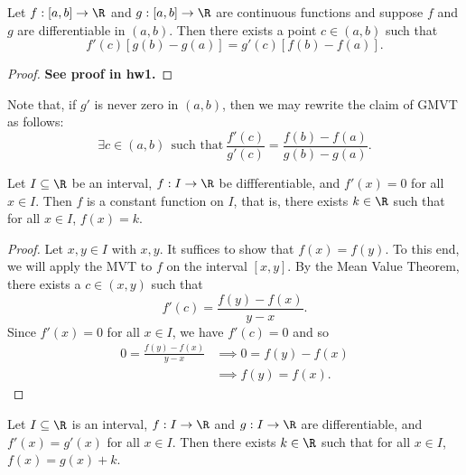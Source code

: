 \begin{theorem}\label{Generalized Mean Value Theorem}
    Let \( f: [a,b] \to \R  \) and \( g : [a,b] \to \R  \) are continuous functions and suppose \( f  \) and \( g  \) are differentiable in \( (a,b) \). Then there exists a point \( c \in (a,b) \) such that 
    \[  f'(c) [g(b) - g(a)] = g'(c) [f(b) - f(a)]. \]
\end{theorem}
\begin{proof}
    \textbf{See proof in hw1.}
\end{proof}

\begin{remark}
    Note that, if \( g'  \) is never zero in \( (a,b) \), then we may rewrite the claim of GMVT as follows:
    \[  \exists c \in (a,b) \ \ \text{such that} \ \frac{ f'(c) }{  g'(c) } =  \frac{ f(b) - f(a) }{  g(b) - g(a) }. \]
\end{remark}

\begin{corollary}[Corollary 1]\label{Corollary 1}
    Let \( I \subseteq  \R   \) be an interval, \( f : I \to \R  \) be diffferentiable, and \( f'(x) = 0  \) for all \( x \in I  \). Then \( f  \) is a constant function on \( I  \), that is, there exists \( k \in \R  \) such that for all \( x \in I  \), \( f(x) = k  \). 
\end{corollary}

\begin{proof}
    Let \( x,y \in I  \) with \( x , y  \). It suffices to show that \( f(x) = f(y) \). To this end, we will apply the MVT to \( f  \) on the interval \( [x,y] \). By the Mean Value Theorem, there exists a \( c \in (x,y) \) such that 
    \[  f'(c) = \frac{ f(y) - f(x)  }{  y - x  }. \]
    Since \( f'(x) = 0  \) for all \( x \in I  \), we have \( f'(c) = 0  \) and so
    \begin{align*}
        0 = \frac{ f(y) - f(x) }{  y - x  }  &\implies 0 = f(y) - f(x)   \\
                                             &\implies f(y) = f(x).
    \end{align*}
\end{proof}

\begin{corollary}
    Let \( I \subseteq  \R   \) is an interval, \( f: I \to \R  \) and \( g: I \to \R  \) are differentiable, and \( f'(x) = g'(x) \) for all \( x \in I  \). Then there exists \( k \in \R  \) such that for all \( x \in I  \), \( f(x) = g(x) + k  \).
\end{corollary}

